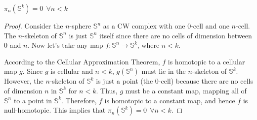 \documentclass[12pt]{article}
\begin{document}

\begin{corollary}
	\(\pi_n(\mathbb{S}^k) = 0 \ \ \forall n < k\)
\end{corollary}

\begin{proof}
	
	Consider the \(n\)-sphere \(\mathbb{S}^n\) as a CW complex with one 0-cell and one \(n\)-cell. The \(n\)-skeleton of \(\mathbb{S}^n\) is just \(\mathbb{S}^n\) itself since there are no cells of dimension between 0 and \(n\). Now let's take any map \(f: \mathbb{S}^n \rightarrow \mathbb{S}^k\), where \(n < k\).

	According to the Cellular Approximation Theorem, \(f\) is homotopic to a cellular map \(g\). Since \(g\) is cellular and \(n < k\), \(g(\mathbb{S}^n)\) must lie in the \(n\)-skeleton of \(\mathbb{S}^k\). However, the \(n\)-skeleton of \(\mathbb{S}^k\) is just a point (the 0-cell) because there are no cells of dimension \(n\) in \(\mathbb{S}^k\) for \(n < k\). Thus, \(g\) must be a constant map, mapping all of \(\mathbb{S}^n\) to a point in \(\mathbb{S}^k\). Therefore, \(f\) is homotopic to a constant map, and hence \(f\) is null-homotopic. This implies that \(\pi_n(\mathbb{S}^k) = 0 \ \ \forall n < k\).
\end{proof}



 

\end{document}
